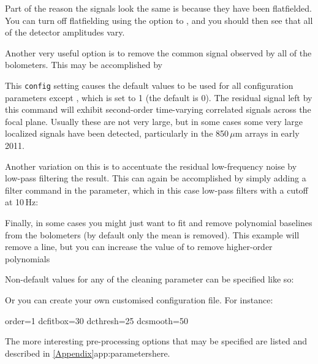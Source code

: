 Part of the reason the signals look the same is because they have been
flatfielded. You can turn off flatfielding using the 
option to , and you should then see that all of the
detector amplitudes vary.

Another very useful option is to remove the common signal observed by
all of the bolometers. This may be accomplished by

\begin{terminalv}
\end{terminalv}

This \texttt{config} setting causes the default values to be used for all
configuration parameters except ,
which is set to 1 (the default is 0).  The residual signal left by this
command will exhibit second-order time-varying correlated signals across
the focal plane.  Usually these are not very large, but in some cases some
very large localized signals have been detected, particularly in the
850\,$\mu$m arrays in early 2011.

Another variation on this is to accentuate the residual low-frequency
noise by low-pass filtering the result. This can again be accomplished
by simply adding a filter command in the  parameter,
which in this case low-pass filters with a cutoff at 10\,Hz:

\begin{terminalv}
\end{terminalv}

Finally, in some cases you might just want to fit and remove
polynomial baselines from the bolometers (by default only the mean is
removed). This example will remove a line, but you can increase the
value of  to remove higher-order polynomials

\begin{terminalv}
\end{terminalv}

Non-default values for any of the cleaning parameter can be specified like so:
\begin{terminalv}
\end{terminalv}
Or you can create your own customised configuration file. For instance:

\begin{terminalv}
order=1
dcfitbox=30
dcthresh=25
dcsmooth=50
\end{terminalv}

The more interesting pre-processing options that may be specified are listed
and described in \cref{Appendix}{app:parameters}{here}.




